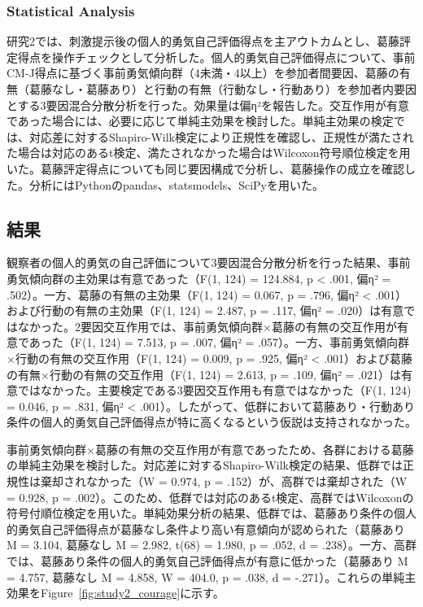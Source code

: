 \documentclass[utf8]{FrontiersinHarvard}
\begin{document}
\subsubsection{Statistical Analysis}

研究2では、刺激提示後の個人的勇気自己評価得点を主アウトカムとし、葛藤評定得点を操作チェックとして分析した。個人的勇気自己評価得点について、事前CM-J得点に基づく事前勇気傾向群（4未満・4以上）を参加者間要因、葛藤の有無（葛藤なし・葛藤あり）と行動の有無（行動なし・行動あり）を参加者内要因とする3要因混合分散分析を行った。効果量は偏η²を報告した。交互作用が有意であった場合には、必要に応じて単純主効果を検討した。単純主効果の検定では、対応差に対するShapiro-Wilk検定により正規性を確認し、正規性が満たされた場合は対応のあるt検定、満たされなかった場合はWilcoxon符号順位検定を用いた。葛藤評定得点についても同じ要因構成で分析し、葛藤操作の成立を確認した。分析にはPythonのpandas、statsmodels、SciPyを用いた。

\subsection{結果}

観察者の個人的勇気の自己評価について3要因混合分散分析を行った結果、事前勇気傾向群の主効果は有意であった（F(1, 124) = 124.884, p \textless{} .001, 偏η² = .502）。一方、葛藤の有無の主効果（F(1, 124) = 0.067, p = .796, 偏η² \textless{} .001）および行動の有無の主効果（F(1, 124) = 2.487, p = .117, 偏η² = .020）は有意ではなかった。2要因交互作用では、事前勇気傾向群×葛藤の有無の交互作用が有意であった（F(1, 124) = 7.513, p = .007, 偏η² = .057）。一方、事前勇気傾向群×行動の有無の交互作用（F(1, 124) = 0.009, p = .925, 偏η² \textless{} .001）および葛藤の有無×行動の有無の交互作用（F(1, 124) = 2.613, p = .109, 偏η² = .021）は有意ではなかった。主要検定である3要因交互作用も有意ではなかった（F(1, 124) = 0.046, p = .831, 偏η² \textless{} .001）。したがって、低群において葛藤あり・行動あり条件の個人的勇気自己評価得点が特に高くなるという仮説は支持されなかった。

事前勇気傾向群×葛藤の有無の交互作用が有意であったため、各群における葛藤の単純主効果を検討した。対応差に対するShapiro-Wilk検定の結果、低群では正規性は棄却されなかった（W = 0.974, p = .152）が、高群では棄却された（W = 0.928, p = .002）。このため、低群では対応のあるt検定、高群ではWilcoxonの符号付順位検定を用いた。単純効果分析の結果、低群では、葛藤あり条件の個人的勇気自己評価得点が葛藤なし条件より高い有意傾向が認められた（葛藤あり M = 3.104, 葛藤なし M = 2.982, t(68) = 1.980, p = .052, d = .238）。一方、高群では、葛藤あり条件の個人的勇気自己評価得点が有意に低かった（葛藤あり M = 4.757, 葛藤なし M = 4.858, W = 404.0, p = .038, d = -.271）。これらの単純主効果をFigure~\ref{fig:study2_courage}に示す。
\end{document}
